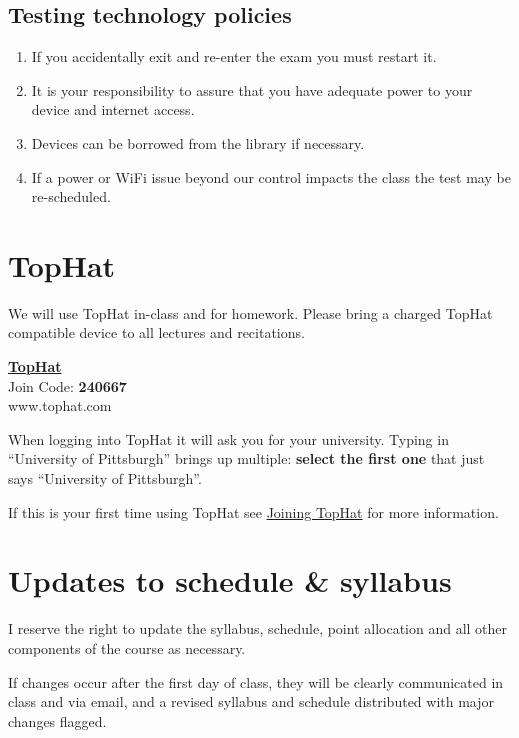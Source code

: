 \documentclass[
]{book}
\providecommand{\tightlist}{%
  \setlength{\itemsep}{0pt}\setlength{\parskip}{0pt}}
\begin{document}
\hypertarget{testing-technology-policies}{%
\section{Testing technology policies}\label{testing-technology-policies}}

\begin{enumerate}
\def\labelenumi{\arabic{enumi}.}
\tightlist
\item
  If you accidentally exit and re-enter the exam you must restart it.
\item
  It is your responsibility to assure that you have adequate power to your device and internet access.
\item
  Devices can be borrowed from the library if necessary.
\item
  If a power or WiFi issue beyond our control impacts the class the test may be re-scheduled.
\end{enumerate}

\hypertarget{tophat}{%
\chapter{TopHat}\label{tophat}}

We will use TopHat in-class and for homework. Please bring a charged TopHat compatible device to all lectures and recitations.

\href{www.tophat.com}{\textbf{TopHat}}\\
Join Code: \textbf{240667}\\
www.tophat.com

When logging into TopHat it will ask you for your university. Typing in ``University of Pittsburgh'' brings up multiple: \textbf{select the first one} that just says ``University of Pittsburgh''.

If this is your first time using TopHat see \href{https://canvas.pitt.edu/courses/106737/pages/joining-tophat?module_item_id=2272350}{Joining TopHat} for more information.

\hypertarget{updates-to-schedule-syllabus}{%
\chapter{Updates to schedule \& syllabus}\label{updates-to-schedule-syllabus}}

I reserve the right to update the syllabus, schedule, point allocation and all other components of the course as necessary.

If changes occur after the first day of class, they will be clearly communicated in class and via email, and a revised syllabus and schedule distributed with major changes flagged.
\end{document}
